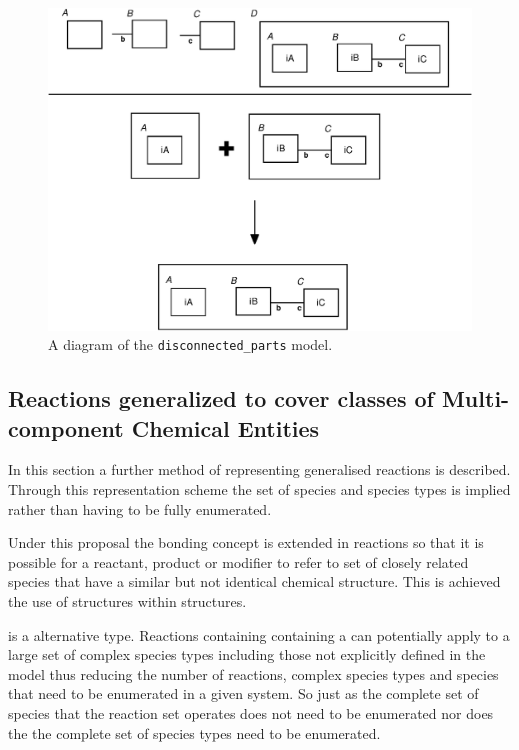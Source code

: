 \documentclass{cekarticle}
\begin{document}
\begin{figure}[h]
  \vspace*{8pt}
  \centering
  \includegraphics[scale = 0.7]{disconnected_parts.eps}
  \caption{A diagram of the \texttt{disconnected\_parts} model.}
  \label{fig:disconnected_parts}
\end{figure}

\subsection{Reactions generalized to cover classes of Multi-component Chemical Entities}
\label{sec:generalizedreactions}

In this section a further method of representing generalised
reactions is described.  Through this representation scheme the
set of species and species types is implied rather than having to
be fully enumerated.

Under this proposal the bonding concept is extended in reactions so that it is possible
for a reactant, product or modifier to refer to set of closely related species that have a
similar but not identical chemical structure.
This is achieved the use of  structures within 
structures.

 is a alternative  type.  Reactions containing containing a
 can potentially
apply to a large set of complex species types including those not explicitly defined in the model thus
reducing the number of reactions, complex species types and species that
need to be enumerated in a given system.  So just as the complete set of species that the reaction set
operates does not need to be enumerated nor does the the complete set of species types need to be
enumerated.
\end{document}
